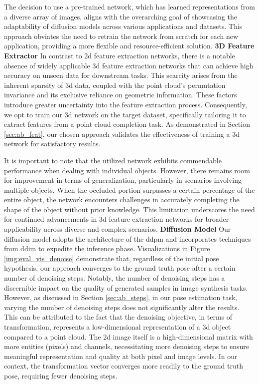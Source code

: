 \documentclass[12pt,DIV14,BCOR12mm,a4paper,footinclude=false,headinclude,parskip=half-,twoside,openright,cleardoublepage=empty,toc=index,bibliography=totoc,listof=totoc]{scrreprt}
\numberwithin{equation}{chapter}
\begin{document}
The decision to use a pre-trained network, which has learned representations from a diverse array of images, aligns with the overarching goal of showcasing the adaptability of diffusion models across various applications and datasets. This approach obviates the need to retrain the network from scratch for each new application, providing a more flexible and resource-efficient solution.
\bigbreak
\textbf{3D Feature Extractor} \quad In contrast to \gls{2d} feature extraction networks, there is a notable absence of widely applicable \gls{3d} feature extraction networks that can achieve high accuracy on unseen data for downstream tasks. This scarcity arises from the inherent sparsity of \gls{3d} data, coupled with the point cloud's permutation invariance and its exclusive reliance on geometric information. These factors introduce greater uncertainty into the feature extraction process. Consequently, we opt to train our \gls{3d} network on the target dataset, specifically tailoring it to extract features from a point cloud completion task. As demonstrated in Section \ref{sec:ab_feat}, our chosen approach validates the effectiveness of training a \gls{3d} network for satisfactory results.

It is important to note that the utilized network exhibits commendable performance when dealing with individual objects. However, there remains room for improvement in terms of generalization, particularly in scenarios involving multiple objects. When the occluded portion surpasses a certain percentage of the entire object, the network encounters challenges in accurately completing the shape of the object without prior knowledge. This limitation underscores the need for continued advancements in \gls{3d} feature extraction networks for broader applicability across diverse and complex scenarios.
\bigbreak
\textbf{Diffusion Model} \quad Our diffusion model adopts the architecture of the \gls{ddpm} and incorporates techniques from \gls{ddim} to expedite the inference phase. Visualizations in Figure \ref{img:eval_vis_denoise} demonstrate that, regardless of the initial pose hypothesis, our approach converges to the ground truth pose after a certain number of denoising steps. Notably, the number of denoising steps has a discernible impact on the quality of generated samples in image synthesis tasks. However, as discussed in Section \ref{sec:ab_steps}, in our pose estimation task, varying the number of denoising steps does not significantly alter the results. This can be attributed to the fact that the denoising objective, in terms of transformation, represents a low-dimensional representation of a \gls{3d} object compared to a point cloud. The \gls{2d} image itself is a high-dimensional matrix with more entities (pixels) and channels, necessitating more denoising steps to ensure meaningful representation and quality at both pixel and image levels. In our context, the transformation vector converges more readily to the ground truth pose, requiring fewer denoising steps.
\end{document}
